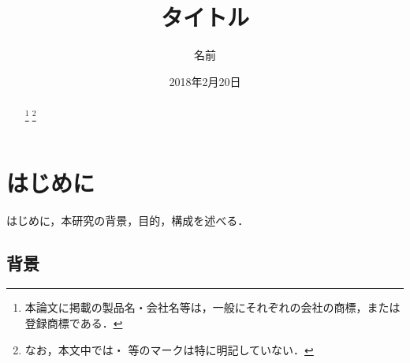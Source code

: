 \documentclass[a4paper,11pt]{ujreport}
\title{タイトル}
\author{名前}
\date
{2018年2月20日}
\begin{document}
\maketitle
\begin{abstract}


\vspace{11cm}
\renewcommand{\thefootnote}{\fnsymbol{footnote}}

\footnote[0]{本論文に掲載の製品名・会社名等は，一般にそれぞれの会社の商標，または登録商標である．}
\footnote[0]{なお，本文中では\texttrademark ・ \textregistered 等のマークは特に明記していない．}
\end{abstract}



\setcounter{page}{0}

\tableofcontents
\newpage

\chapter{はじめに}\label{chap:beginning}
はじめに，本研究の背景，目的，構成を述べる．


%

\section{背景}

\end{document}
